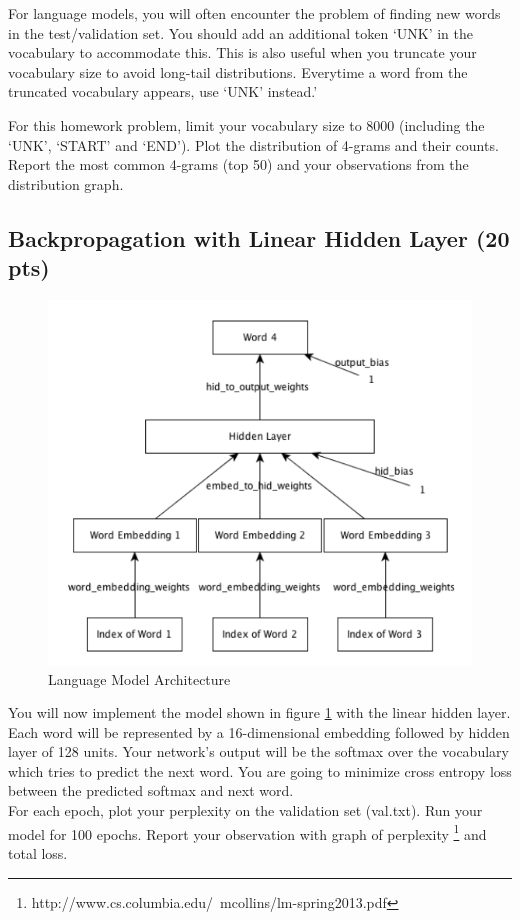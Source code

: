 \documentclass[10pt]{article}
\begin{document}
For language models, you will often encounter the problem of finding new words in the test/validation set. You should add an additional token `UNK' in the vocabulary to accommodate this. This is also useful when you truncate your vocabulary size to avoid long-tail distributions. Everytime a word from the truncated vocabulary appears, use `UNK' instead.'

For this homework problem, limit your vocabulary size to 8000 (including the `UNK', `START' and `END'). Plot the distribution of 4-grams and their counts. Report the most common 4-grams (top 50) and your observations from the distribution graph.

\subsection{Backpropagation with Linear Hidden Layer (20 pts)}
\begin{figure}
  \centering
  \includegraphics[width=0.6\linewidth]{lm.png}
  \caption{Language Model Architecture}
  \label{fig:lm}
\end{figure}

You will now implement the model shown in figure \ref{fig:lm} with the linear 
hidden layer. 
Each word will be represented by a 16-dimensional embedding followed by hidden layer of 128 units. Your network's output will be the softmax over the vocabulary which tries to predict the next word. You are going to minimize cross entropy loss between the predicted softmax and next word.
\\

For each epoch, plot your perplexity on the validation set (val.txt). Run your model for 100 epochs. Report your observation with graph of perplexity \footnote{http://www.cs.columbia.edu/~mcollins/lm-spring2013.pdf} and total loss.
\\
\end{document}
